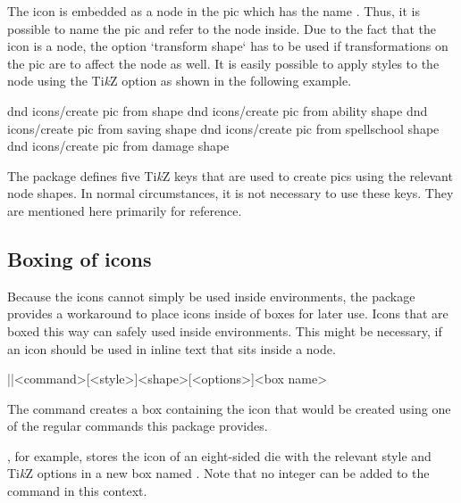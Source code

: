\documentclass[a4paper]{article}
\begin{document}
The icon is embedded as a node in the pic which has the name . Thus, it is possible to name the pic and refer to the node inside. Due to the fact that the icon is a node, the option `transform shape` has to be used if transformations on the pic are to affect the node as well. It is easily possible to apply styles to the node using the Ti\emph{k}Z option  as shown in the following example.

\begin{codeexample}
\end{codeexample}

\begin{macrodef}
dnd icons/create pic from shape
dnd icons/create pic from ability shape
dnd icons/create pic from saving shape 
dnd icons/create pic from spellschool shape
dnd icons/create pic from damage shape
\end{macrodef}
The package defines five Ti\emph{k}Z keys that are used to create pics using the relevant node shapes. In normal circumstances, it is not necessary to use these keys. They are mentioned here primarily for reference. 

\subsection{Boxing of icons}

Because the icons cannot simply be used inside  environments, the package provides a workaround to place icons inside of boxes for later use. Icons that are boxed this way can safely used inside  environments. This might be necessary, if an icon should be used in inline text that sits inside a node.

\begin{macrodef}|\provideprotecteddndicon|{<command>}[<style>]{<shape>}[<options>]{<box name>}\end{macrodef}
The command \macro{\provideprotecteddndicon} creates a box containing the icon that would be created using one of the regular commands this package provides. 

, for example, stores the icon of an eight-sided die with the relevant style and Ti\emph{k}Z options in a new box named . Note that no integer can be added to the  command in this context.
\end{document}
